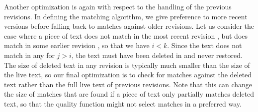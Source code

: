 Another optimization is again with respect to the handling of the
previous revisions.
In defining the matching algorithm, we give preference to more recent
versions before falling back to matches against older revisions.
Let us consider the case where a piece of text does not match in the
most recent revision ,
but does match in some earlier revision , so that we have $i < k$.
Since the text does not match in any  for $j > i$,
the text must have been deleted in  and
never restored.
The size of deleted text in any revision is typically much smaller
than the size of the live text, so our final optimization is
to check for matches against the deleted text rather than the full
live text of previous revisions.
Note that this can change the size of matches that are found
if a piece of text only partially matches deleted text,
so that the quality function might not select matches in a preferred way.

